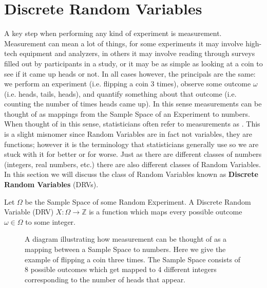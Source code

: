\section{Discrete Random Variables}
A key step when performing any kind of experiment is measurement. Measurement can mean a lot of things, for some experiments it may involve high-tech equipment and analyzers, in others it may involve reading through surveys filled out by participants in a study, or it may be as simple as looking at a coin to see if it came up heads or not. In all cases however, the principals are the same: we perform an experiment (i.e. flipping a coin 3 times), observe some outcome $\omega$ (i.e. heads, tails, heads), and quantify something about that outcome (i.e. counting the number of times heads came up). In this sense measurements can be thought of as mappings from the Sample Space of an Experiment to numbers. When thought of in this sense, statisticians often refer to measurements as . This is a slight misnomer since Random Variables are in fact not variables, they are functions; however it is the terminology that statisticians generally use so we are stuck with it for better or for worse. Just as there are different classes of numbers (integers, real numbers, etc.) there are also different classes of Random Variables. In this section we will discuss the class of Random Variables known as \textbf{Discrete Random Variables} (DRVs).
\begin{definition}
    Let $\Omega$ be the Sample Space of some Random Experiment. A Discrete Random Variable (DRV) $X:\Omega\to\mathbb Z$ is a function which maps every possible outcome $\omega\in\Omega$ to some integer.
\end{definition}

\begin{figure}
    \centering
    
    
    \caption{A diagram illustrating how measurement can be thought of as a mapping between a Sample Space to numbers. Here we give the example of flipping a coin three times. The Sample Space consists of 8 possible outcomes which get mapped to 4 different integers corresponding to the number of heads that appear.}
    \label{fig:measurement}
\end{figure}

